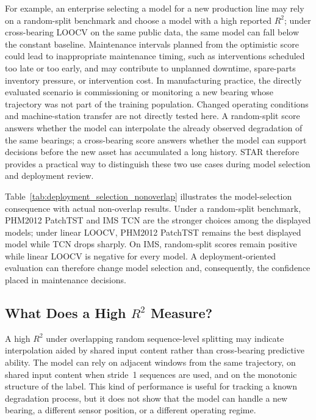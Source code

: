 \documentclass[pdflatex,sn-basic,NameDate]{sn-jnl}
\begin{document}
For example, an enterprise selecting a model for a new production line may rely on a random-split benchmark and choose a model with a high reported $R^2$; under cross-bearing LOOCV on the same public data, the same model can fall below the constant baseline. Maintenance intervals planned from the optimistic score could lead to inappropriate maintenance timing, such as interventions scheduled too late or too early, and may contribute to unplanned downtime, spare-parts inventory pressure, or intervention cost. In manufacturing practice, the directly evaluated scenario is commissioning or monitoring a new bearing whose trajectory was not part of the training population. Changed operating conditions and machine-station transfer are not directly tested here. A random-split score answers whether the model can interpolate the already observed degradation of the same bearings; a cross-bearing score answers whether the model can support decisions before the new asset has accumulated a long history. STAR therefore provides a practical way to distinguish these two use cases during model selection and deployment review.

Table~\ref{tab:deployment_selection_nonoverlap} illustrates the model-selection consequence with actual non-overlap results. Under a random-split benchmark, PHM2012 PatchTST and IMS TCN are the stronger choices among the displayed models; under linear LOOCV, PHM2012 PatchTST remains the best displayed model while TCN drops sharply. On IMS, random-split scores remain positive while linear LOOCV is negative for every model. A deployment-oriented evaluation can therefore change model selection and, consequently, the confidence placed in maintenance decisions.




\subsection{What Does a High $R^2$ Measure?}
A high $R^2$ under overlapping random sequence-level splitting may indicate interpolation aided by shared input content rather than cross-bearing predictive ability. The model can rely on adjacent windows from the same trajectory, on shared input content when stride~1 sequences are used, and on the monotonic structure of the label. This kind of performance is useful for tracking a known degradation process, but it does not show that the model can handle a new bearing, a different sensor position, or a different operating regime.
\end{document}
